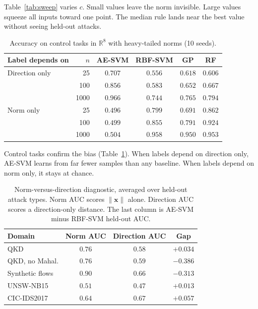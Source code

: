 \documentclass[journal]{IEEEtran}
\begin{document}
Table~\ref{tab:sweep} varies $c$. Small values leave the norm invisible. Large
values squeeze all inputs toward one point. The median rule lands near the best
value without seeing held-out attacks.

\begin{table}[t]
  \centering
  \caption{Accuracy on control tasks in $\mathbb{R}^8$ with heavy-tailed norms (10 seeds).}
  \label{tab:cross}
  \footnotesize
  \setlength{\tabcolsep}{3pt}
  \begin{tabular}{lrcccc}
    \toprule
    Label depends on & $n$ & AE-SVM & RBF-SVM & GP & RF \\
    \midrule
    Direction only & 25 & $0.707$ & $0.556$ & $0.618$ & $0.606$ \\
     & 100 & $0.856$ & $0.583$ & $0.652$ & $0.667$ \\
     & 1000 & $0.966$ & $0.744$ & $0.765$ & $0.794$ \\
    Norm only & 25 & $0.496$ & $0.799$ & $0.691$ & $0.862$ \\
     & 100 & $0.499$ & $0.855$ & $0.791$ & $0.924$ \\
     & 1000 & $0.504$ & $0.958$ & $0.950$ & $0.953$ \\
    \bottomrule
  \end{tabular}
\end{table}

Control tasks confirm the bias (Table~\ref{tab:cross}). When labels depend on
direction only, AE-SVM learns from far fewer samples than any baseline. When labels
depend on norm only, it stays at chance.

\begin{table}[t]
  \centering
  \caption{Norm-versus-direction diagnostic, averaged over held-out attack types. Norm AUC scores $\|\mathbf{x}\|$ alone. Direction AUC scores a direction-only distance. The last column is AE-SVM minus RBF-SVM held-out AUC.}
  \label{tab:diag}
  \footnotesize
  \setlength{\tabcolsep}{3pt}
  \begin{tabular}{lccc}
    \toprule
    Domain & Norm AUC & Direction AUC & Gap \\
    \midrule
    QKD & $0.76$ & $0.58$ & $+0.034$ \\
    QKD, no Mahal. & $0.76$ & $0.59$ & $-0.386$ \\
    Synthetic flows & $0.90$ & $0.66$ & $-0.313$ \\
    UNSW-NB15 & $0.51$ & $0.47$ & $+0.013$ \\
    CIC-IDS2017 & $0.64$ & $0.67$ & $+0.057$ \\
    \bottomrule
  \end{tabular}
\end{table}
\end{document}
